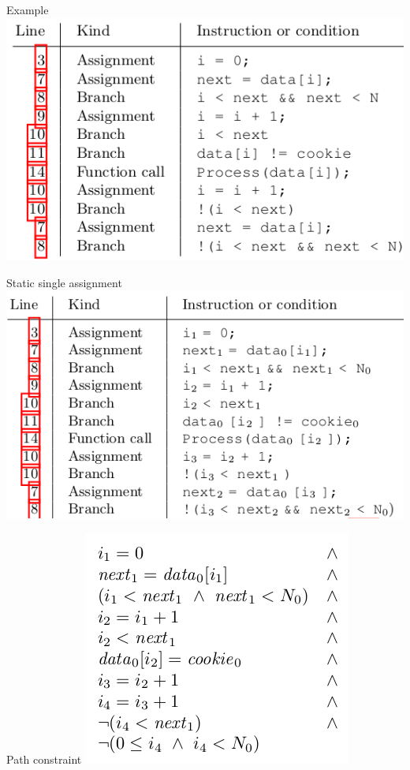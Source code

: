 \documentclass{beamer}
\begin{document}
\begin{frame}{Example}
\includegraphics[scale=0.5]{trace1.png}
\end{frame}

\begin{frame}{Static single assignment}
\includegraphics[scale=0.5]{static_single_assignment.png}
\end{frame}

\begin{frame}{Path constraint}
\includegraphics[scale=0.5]{path_constraint1.png}
\end{frame}
\end{document}
